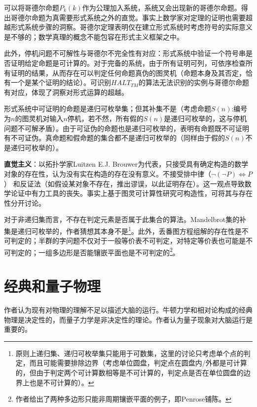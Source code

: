 \par 可以将哥德尔命题$P_k(k)$作为公理加入系统，系统又会出现新的哥德尔命题。得出哥德尔命题为真需要形式系统之外的直觉。事实上数学家对定理的证明也需要超越形式系统步骤的洞察。哥德尔定理表明仅在建立形式系统时考虑符号的实际意义是不够的；数学真理的概念不能包容在形式主义框架之中。

\par 此外，停机问题不可解性与哥德尔不完全性有对应：形式系统中验证一个符号串是否证明给定命题是可计算的。对于完备的系统，由于所有证明可列，可依序检查所有证明的结果，从而存在可以判定任何命题真伪的图灵机（命题本身及其否定，恰有一个是某个证明的结论）。可识别$HALT_{TM}$的算法无法识别的实例与哥德尔命题有对应，体现了洞察对形式运算的超越。

\par 形式系统中可证明的命题是递归可枚举集；但其补集不是（考虑命题$S(n)$:编号为$n$的图灵机对输入$n$停机，若不然，所有假的$S(n)$是递归可枚举的，这与停机问题不可解矛盾）。由于可证伪的命题也是递归可枚举的，表明有命题既不可证明有不可证伪。真命题和假命题的集合都不是递归可枚举的（同样由于假的$S(n)$不是递归可枚举的）。

\par \textbf{直觉主义}：以拓扑学家Luitzen E.J. Brouwer为代表，只接受具有确定构造的数学对象的存在性，认为没有实在构造的存在没有意义。不接受排中律（$\lnot (\lnot P) \iff P$） 和反证法（如假设某对象不存在，推出谬误，以此证明存在）。这一观点导致数学论证中有力工具的丧失。事实上基于图灵可计算性研究可构造性，可将其与存在性分开讨论。

\par 对于非递归集而言，不存在判定元素是否属于此集合的算法。Mandelbrot集的补集是递归可枚举的，作者猜想其本身不是\footnote{原则上递归集、递归可枚举集只能用于可数集，这里的讨论只考虑单个点的判定，而且可能需要排除边界（考虑单位圆盘，判定点在圆盘内/外都是可计算的，但由于判定两个可计算数相等是不可计算的，判定点是否在单位圆盘的边界上也是不可计算的）。}。此外，丢番图方程组解的存在性是不可判定的；半群的字问题不仅对于一般等价表不可判定，对特定等价表也可能是不可判定的；一组多边形是否能镶嵌平面也是不可判定的\footnote{作者给出了两种多边形只能非周期镶嵌平面的例子，即Penrose铺陈。}。

\section{经典和量子物理}
\par 作者认为现有对物理的理解不足以描述大脑的运行。牛顿力学和相对论构成的经典物理是决定性的，而量子力学是非决定性的理论。作者认为量子现象对大脑运行是重要的。